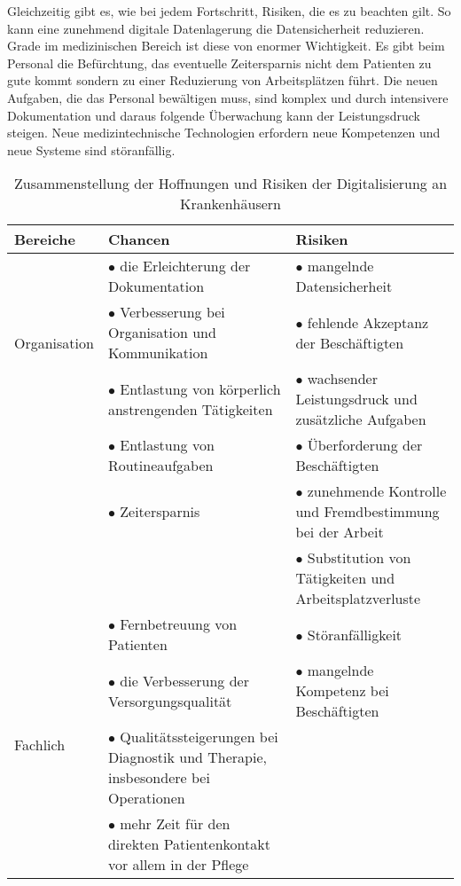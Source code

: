 Gleichzeitig gibt es, wie bei jedem Fortschritt, Risiken, die es zu beachten gilt. So kann eine zunehmend digitale Datenlagerung die Datensicherheit reduzieren. Grade im medizinischen Bereich ist diese von enormer Wichtigkeit. Es gibt beim Personal die Befürchtung, das eventuelle Zeitersparnis nicht dem Patienten zu gute kommt sondern zu einer Reduzierung von Arbeitsplätzen führt. Die neuen Aufgaben, die das Personal bewältigen muss, sind komplex und durch intensivere Dokumentation und daraus folgende Überwachung kann der Leistungsdruck steigen. Neue medizintechnische Technologien erfordern neue Kompetenzen und neue Systeme sind störanfällig. \parencite{braeutigam2017}
\begin{table}[h]
	\begin{tabular}{l|p{}|p{}}
	\textbf{Bereiche}&\textbf{Chancen}&\textbf{Risiken}\\
	\hline
	\multirow{3}{*}{Organisation}
		&$\bullet$ die Erleichterung der Dokumentation &$\bullet$ mangelnde Datensicherheit\\
		&$\bullet$ Verbesserung bei Organisation und Kommunikation &$\bullet$ fehlende Akzeptanz der Beschäftigten\\
	\hline
	\multirow{7}{*}{Personal}
		&$\bullet$ Entlastung von körperlich anstrengenden Tätigkeiten &$\bullet$ wachsender Leistungsdruck und zusätzliche Aufgaben\\
		&$\bullet$ Entlastung von Routineaufgaben &$\bullet$ Überforderung der Beschäftigten\\
		&$\bullet$ Zeitersparnis&$\bullet$ zunehmende Kontrolle und Fremdbestimmung bei der Arbeit\\
		&&$\bullet$ Substitution von Tätigkeiten und Arbeitsplatzverluste\\
	\hline
	\multirow{6}{*}{Fachlich}
		&$\bullet$ Fernbetreuung von Patienten&$\bullet$ Störanfälligkeit\\
		&$\bullet$ die Verbesserung der Versorgungsqualität &$\bullet$ mangelnde Kompetenz bei Beschäftigten\\
		&$\bullet$ Qualitätssteigerungen bei Diagnostik und Therapie, insbesondere bei Operationen&\\
		&$\bullet$ mehr Zeit für den direkten Patientenkontakt vor allem in der Pflege&\\
	\end{tabular}
	\caption{Zusammenstellung der Hoffnungen und Risiken der Digitalisierung an Krankenhäusern \parencite{braeutigam2017}}
	\label{tab:hoffnung_risiken}
\end{table}
